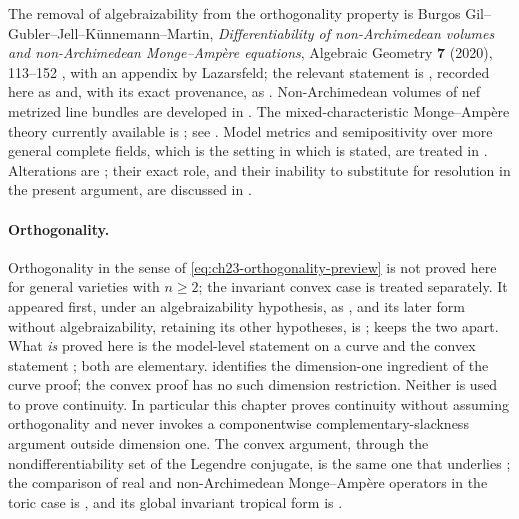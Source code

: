 The removal of algebraizability from the orthogonality property is
Burgos Gil--Gubler--Jell--K\"unnemann--Martin, \emph{Differentiability of
non-Archimedean volumes and non-Archimedean Monge--Amp\`ere equations},
Algebraic Geometry \textbf{7} (2020), 113--152 \cite{BGGJKM20}, with an
appendix by Lazarsfeld; the relevant statement is
\cite[Theorem~6.3.3]{BGGJKM20}, recorded here as
 and, with its exact provenance,
as .  Non-Archimedean volumes of nef
metrized line bundles are developed in \cite{BGM21}.  The
mixed-characteristic Monge--Amp\`ere theory currently available is
\cite{FGK25}; see .  Model metrics and
semipositivity over more general complete fields, which is the setting in
which  is stated, are treated in
\cite{GM19}.  Alterations are \cite{deJong1996}; their exact role, and their
inability to substitute for resolution in the present argument, are
discussed in .

\paragraph{Orthogonality.}
Orthogonality in the sense of
\eqref{eq:ch23-orthogonality-preview} is not proved here for general
varieties with $n\geq2$; the invariant convex case is treated separately.
It appeared first, under an algebraizability hypothesis, as
\cite[Theorem~A.4]{BFJ15}, and its later form without algebraizability, retaining its other
hypotheses, is
\cite{BGGJKM20};  keeps the two apart.
What \emph{is} proved here is the model-level statement
 on a curve and the convex
statement ; both are
elementary.   identifies the
dimension-one ingredient of the curve proof; the convex proof has no such
dimension restriction.  Neither is used to prove continuity.
In particular this chapter proves continuity
without assuming orthogonality and never invokes a componentwise
complementary-slackness argument outside dimension one.  The convex
argument, through the nondifferentiability set of the Legendre conjugate, is
the same one that underlies ; the
comparison of real and non-Archimedean Monge--Amp\`ere operators in the
toric case is \cite{Vil20}, and its global invariant tropical form is
\cite{BGJKK25}.

